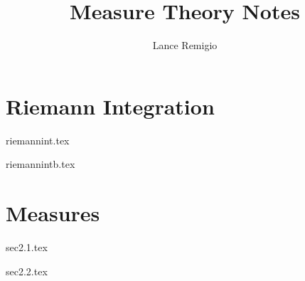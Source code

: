 \documentclass[11pt,a4paper]{book}
\title{Measure Theory Notes}
\author{Lance Remigio}
\begin{document}
\maketitle
\tableofcontents
\listoftheorems[ignoreall,show={theorem,defn}]

\chapter{Riemann Integration}


{riemannint.tex}

{riemannintb.tex}

\chapter{Measures}

{sec2.1.tex}

{sec2.2.tex}

% 
\end{document}
